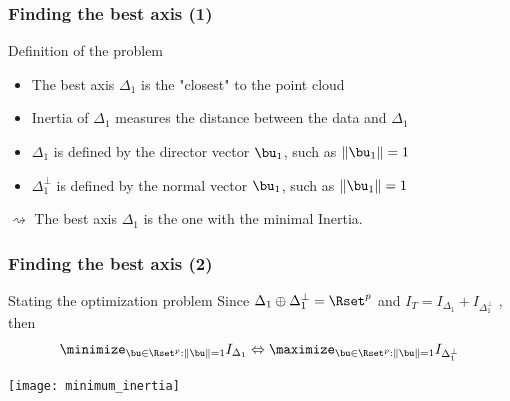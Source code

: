 \documentclass{beamer}\usepackage[]{graphicx}\usepackage[]{color}
\begin{document}
\begin{frame}
  \frametitle{Finding the best axis (1)}

  \begin{block}{Definition of the problem}
    \begin{itemize}
      \item The best axis $\Delta_1$ is the "closest" to the point cloud
      \item Inertia of $\Delta_1$ measures the distance between the data and $\Delta_1$
      \item $\Delta_1$ is defined by the director vector $\bu_1$, such as $\| \bu_1 \| = 1$
      \item $\Delta_1^\bot$ is defined by the normal  vector $\bu_1$, such as $\| \bu_1 \| = 1$
    \end{itemize}
    \alert{$\rightsquigarrow$ The best axis $\Delta_1$ is the one with the minimal Inertia.}
  \end{block}
  
\end{frame}

\begin{frame}
  \frametitle{Finding the best axis (2)}

  \begin{block}{Stating the optimization problem}
    Since $\Delta_1 \oplus \Delta_1^\bot = \Rset^p$ and $I_T = I_{\Delta_1} + I_{\Delta_1^\bot}$ , then
    \begin{equation*}
        \minimize_{\bu \in \Rset^p: \|\bu\| = 1} I_{\Delta_1} \Leftrightarrow \maximize_{\bu \in \Rset^p: \|\bu\| = 1} I_{\Delta_1^\bot}
    \end{equation*} 
  \end{block}  
  
  \texttt{[image: minimum\_inertia]}
  
\end{frame}
\end{document}
